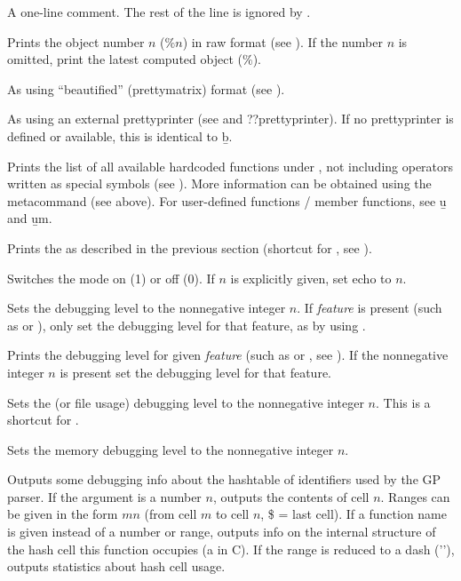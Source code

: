 \subseckbd{\bs\bs} A one-line comment. The rest of the line
is ignored by .

 Prints the object number $n$ ($\%n$)
in raw format (see ). If the number $n$ is omitted, print the
latest computed object ($\%$). \label{se:history}

 As  using ``beautified'' (prettymatrix)
format (see ).

 As  using an external prettyprinter (see
 and ??prettyprinter). If no prettyprinter is defined or
available, this is identical to \b{b}.

 Prints the list of all available
hardcoded functions under , not including operators written as special
symbols (see ). More information can be obtained using
the  metacommand (see above). For user-defined functions / member
functions, see \b{u} and \b{um}.

 Prints the  as described in the
previous section (shortcut for , see ).

 Switches the  mode on (1) or off (0). If
$n$ is explicitly given, set echo to $n$.

 Sets the debugging level  to the
nonnegative integer $n$. If \emph{feature} is present (such as  or
), only set the debugging level for that feature, as by using
.

 Prints the debugging level for given
\emph{feature} (such as  or , see ).
If the nonnegative integer $n$ is present set the debugging level for
that feature.

 Sets the  (or file usage) debugging level
to the nonnegative integer $n$. This is a shortcut
for .

 Sets the memory debugging level 
to the nonnegative integer $n$.

 Outputs some debugging info about the
hashtable of identifiers used by the GP parser. If the argument is a number
$n$, outputs the contents of cell $n$. Ranges can be given in the form
$m$\kbd{-}$n$ (from cell $m$ to cell $n$, \$ = last cell). If a function name
is given instead of a number or range, outputs info on the internal structure
of the hash cell this function occupies (a  in C). If the
range is reduced to a dash ('\kbd{-}'), outputs statistics about hash cell
usage.

